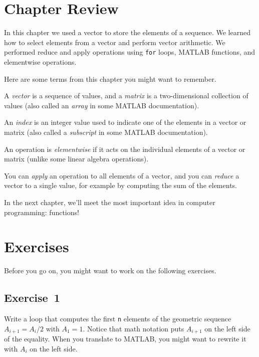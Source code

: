 \section{Chapter Review}

In this chapter we used a vector to store the elements of a sequence.  We learned how to select elements from a vector and perform vector arithmetic.  We performed reduce and apply operations using \lstinline{for} loops, MATLAB functions, and elementwise operations.

Here are some terms from this chapter you might want to remember.


A {\em vector} is a sequence of values, and a {\em matrix} is a two-dimensional collection of values (also called an {\em array} in some MATLAB documentation).

An {\em index} is an integer value used to indicate one of the elements
in a vector or matrix (also called a {\em subscript} in some MATLAB documentation).

An operation is {\em elementwise} if it acts on the individual elements of a vector or matrix (unlike some linear algebra operations).

You can {\em apply} an operation to all elements of a vector, and you can {\em reduce} a vector to a single value, for example by computing the sum of the elements.


In the next chapter, we'll meet the most important idea in computer programming: functions!



\section{Exercises}

Before you go on, you might want to work on the following exercises.

\subsection{Exercise~1}
Write a loop that computes the first \lstinline{n} elements
of the geometric sequence $A_{i+1} = A_i/2$ with $A_1 = 1$.  Notice that
math notation puts $A_{i+1}$ on the left side of the equality.
When you translate to MATLAB, you might want to rewrite it with
$A_{i}$ on the left side.


